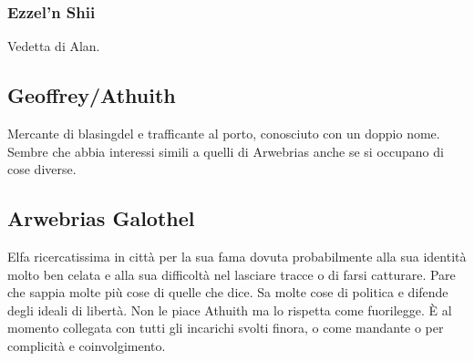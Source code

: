 \documentclass[10pt,twoside,twocolumn]{article}
\begin{document}
\subsubsection{Ezzel'n Shii}
Vedetta di Alan.
\subsection{Geoffrey/Athuith}
Mercante di blasingdel e trafficante al porto, conosciuto con un doppio nome.
Sembre che abbia interessi simili a quelli di Arwebrias anche se si occupano di
cose diverse.
\subsection{Arwebrias Galothel}
Elfa ricercatissima in citt\`a per la sua fama dovuta probabilmente alla sua identit\`a
molto ben celata e alla sua difficolt\`a nel lasciare tracce o di farsi catturare.
Pare che sappia molte pi\`u cose di quelle che dice. Sa molte cose di politica e difende
degli ideali di libert\`a. Non le piace Athuith ma lo rispetta come fuorilegge. \`E al
momento collegata con tutti gli incarichi svolti finora, o come mandante o per complicit\`a
e coinvolgimento.
\end{document}
